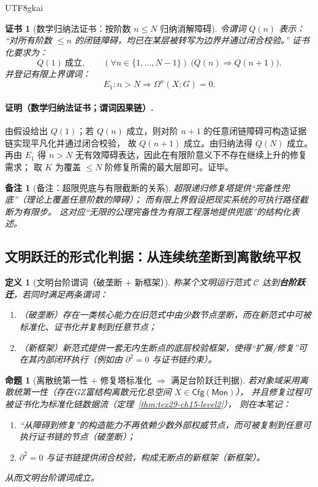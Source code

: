 \documentclass[12pt]{article}
\newtheorem{definition}{定义}[section]
\newtheorem{proposition}{命题}[section]
\newtheorem{remark}{备注}[section]
\newtheorem{Certificate}{证书}[section]
\newcommand{\KouJing}{\texorpdfstring{表述约定}{表述约定}}
\newcommand{\GZMonization}{\texorpdfstring{GZ富结构离散元化}{GZ富结构离散元化}}
\begin{document}
\begin{CJK*}{UTF8}{gkai}
\begin{Certificate}[数学归纳法证书：按阶数 $n\le N$ 归纳消解障碍]
\label{cert:tex29-ch15-finite-converge}
令谓词 $Q(n)$ 表示：
“对所有阶数 $\le n$ 的闭链障碍，均已在某层被转写为边界并通过闭合校验。”
证书化要求为：
\[
  Q(1)\ \text{成立},\qquad (\forall n\in\{1,\dots,N-1\})\ \bigl(Q(n)\Rightarrow Q(n+1)\bigr).
\]
并登记有限上界谓词：
\[
  E_1 : n>N\Rightarrow \Omega^n(X;G)=0.
\]
\end{Certificate}

\paragraph{证明（数学归纳法证书；谓词因果链）.}
由假设给出 $Q(1)$；若 $Q(n)$ 成立，则对阶 $n+1$ 的任意闭链障碍可构造证据链实现平凡化并通过闭合校验，
故 $Q(n+1)$ 成立。由归纳法得 $Q(N)$ 成立。
再由 $E_1$ 得 $n>N$ 无有效障碍表达，因此在有限阶意义下不存在继续上升的修复需求；
取 $K$ 为覆盖 $\le N$ 阶修复所需的最大层即可。证毕。

\begin{remark}[备注：超限兜底与有限截断的关系]
超限递归修复塔提供“完备性兜底”（理论上覆盖任意阶数的障碍）；
而有限上界假设把现实系统的可执行路径截断为有限步。
这对应“无限的公理完备性为有限工程落地提供兜底”的结构化表述。
\end{remark}

\subsection{文明跃迁的形式化判据：从连续统垄断到离散统平权}
\label{subsec:tex29-ch15-civilization}

\begin{definition}[文明台阶谓词（破垄断 + 新框架）]
称某个文明运行范式 $\mathcal{C}$ 达到\textbf{台阶跃迁}，若同时满足两条谓词：
\begin{enumerate}
  \item （破垄断）存在一类核心能力在旧范式中由少数节点垄断，而在新范式中可被标准化、证书化并复制到任意节点；
  \item （新框架）新范式提供一套无内生断点的底层校验框架，使得“扩展/修复”可在其内部闭环执行（例如由 $\partial^2=0$ 与证书链约束）。
\end{enumerate}
\end{definition}

\begin{proposition}[离散统第一性 + 修复塔标准化 $\Rightarrow$ 满足台阶跃迁判据]
\label{prop:tex29-ch15-civilization}
若对象域采用离散统第一性（存在\GZMonization{}总空间 $X\in\mathsf{Cfg}(\mathsf{Mon})$），
并且修复过程可被证书化为标准化链数据流（定理~\ref{thm:tex29-ch15-level2}），
则在本笔记：
\begin{enumerate}
  \item “从障碍到修复”的构造能力不再依赖少数外部权威节点，而可被复制到任意可执行证书链的节点（破垄断）；
  \item $\partial^2=0$ 与证书链提供闭合校验，构成无断点的新框架（新框架）。
\end{enumerate}
从而文明台阶谓词成立。
\end{proposition}


\end{CJK*}
\end{document}
